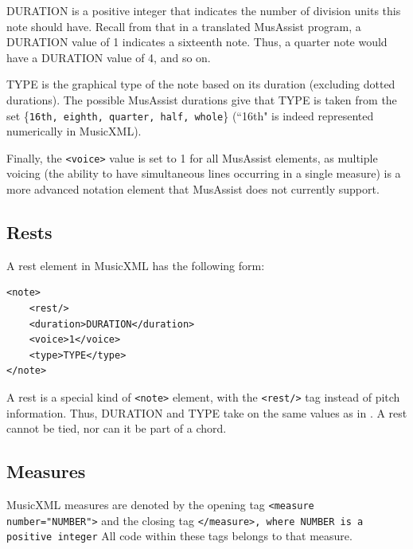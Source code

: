 \documentclass{report}
\begin{document}
DURATION is a positive integer that indicates the number of division units this note should have. Recall from  that in a translated MusAssist program, a DURATION value of 1 indicates a sixteenth note. Thus, a quarter note would have a DURATION value of 4, and so on.

TYPE is the graphical type of the note based on its duration (excluding dotted durations). The possible MusAssist durations give that TYPE is taken from the set \{\verb.16th, eighth, quarter, half, whole.\} (``16th" is indeed represented numerically in MusicXML).

Finally, the \verb.<voice>. value is set to 1 for all MusAssist elements, as multiple voicing (the ability to have simultaneous lines occurring in a single measure) is a more advanced notation element that MusAssist does not currently support. 

\subsection{Rests}
\label{sec:xmlrest}

A rest element in MusicXML has the following form:
\begin{verbatim}
<note>
    <rest/>
    <duration>DURATION</duration>
    <voice>1</voice>
    <type>TYPE</type>
</note>
\end{verbatim}

A rest is a special kind of \verb.<note>. element, with the \verb.<rest/>. tag instead of pitch information. Thus, DURATION and TYPE take on the same values as in . A rest cannot be tied, nor can it be part of a chord.

\subsection{Measures}
\label{sec:xmlmeasure}
MusicXML measures are denoted by the opening tag \verb.<measure number="NUMBER">. and the closing tag \verb.</measure>, where NUMBER is a positive integer. All code within these tags belongs to that measure.

\end{document}
